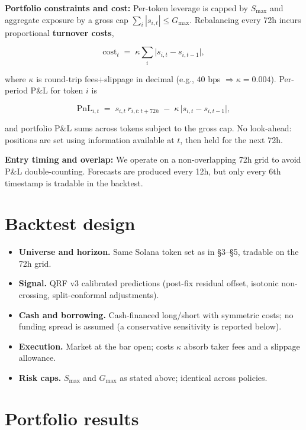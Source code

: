 \documentclass[
  a4paper,
  DIV=11,
  numbers=noendperiod]{scrreprt}
\providecommand{\tightlist}{%
  \setlength{\itemsep}{0pt}\setlength{\parskip}{0pt}}
\begin{document}
\textbf{Portfolio constraints and cost:} Per-token leverage is capped by
\(S_{\max}\) and aggregate exposure by a gross cap
\(\sum_i |s_{i,t}|\le G_{\max}\). Rebalancing every 72h incurs
proportional \textbf{turnover costs},

\[
\text{cost}_t \;=\; \kappa \sum_i \big|s_{i,t}-s_{i,t-1}\big|,
\]

where \(\kappa\) is round-trip fees+slippage in decimal (e.g., \(40\)
bps \(\Rightarrow \kappa=0.004\)). Per-period P\&L for token \(i\) is

\[
\text{PnL}_{i,t} \;=\; s_{i,t}\,r_{i,t:t+72h} \;-\; \kappa\,\big|s_{i,t}-s_{i,t-1}\big|,
\]

and portfolio P\&L sums across tokens subject to the gross cap. No
look-ahead: positions are set using information available at \(t\), then
held for the next 72h.

\textbf{Entry timing and overlap:} We operate on a non-overlapping 72h
grid to avoid P\&L double-counting. Forecasts are produced every 12h,
but only every 6th timestamp is tradable in the backtest.

\section{Backtest design}\label{backtest-design}

\begin{itemize}
\tightlist
\item
  \textbf{Universe and horizon.} Same Solana token set as in §3--§5,
  tradable on the 72h grid.
\item
  \textbf{Signal.} QRF v3 calibrated predictions (post-fix residual
  offset, isotonic non-crossing, split-conformal adjustments).
\item
  \textbf{Cash and borrowing.} Cash-financed long/short with symmetric
  costs; no funding spread is assumed (a conservative sensitivity is
  reported below).
\item
  \textbf{Execution.} Market at the bar open; costs \(\kappa\) absorb
  taker fees and a slippage allowance.
\item
  \textbf{Risk caps.} \(S_{\max}\) and \(G_{\max}\) as stated above;
  identical across policies.
\end{itemize}

\section{Portfolio results}\label{portfolio-results}
\end{document}
